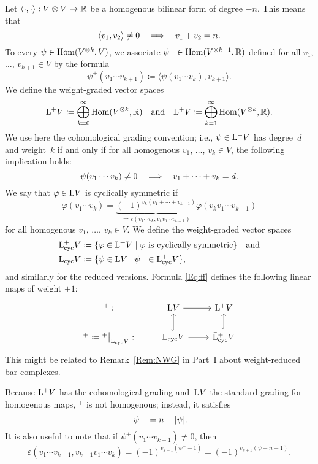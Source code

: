 \documentclass[\MainFolder/Text.tex]{subfiles}
\begin{document}
Let $\langle\cdot,\cdot\rangle: V \otimes V \rightarrow \mathbb{R}$ be a homogenous bilinear form of degree $-n$. This means that
\[ \langle v_1, v_2 \rangle \neq 0\quad\Longrightarrow\quad v_1 + v_2 = n. \]
To every $\psi\in \mathrm{Hom}(V^{\otimes k},V)$, we associate $\psi^+\in \mathrm{Hom}(V^{\otimes k + 1},\mathbb{R})$ defined for all $v_1$, $\dotsc$, $v_{k + 1} \in V$ by the formula
\begin{equation}\label{Eq:ff}
\psi^+(v_1\dotsb v_{k+1}) \coloneqq \langle \psi(v_1 \dotsb v_{k}),v_{k+1}\rangle.
\end{equation}
We define the weight-graded vector spaces
\begin{equation}\label{Eq:DSpPlusDef}
\mathrm{L}^+ V \coloneqq \bigoplus_{k=0}^\infty \mathrm{Hom}(V^{\otimes k},\mathbb{R})\quad\text{and}\quad\bar{\mathrm{L}}^+ V \coloneqq \bigoplus_{k=1}^\infty \mathrm{Hom}(V^{\otimes k},\mathbb{R}).
\end{equation}
We use here the cohomological grading convention; i.e., $\psi\in \mathrm{L}^+ V$ has degree~$d$ and weight~$k$ if and only if for all homogenous $v_1$, $\dotsc$, $v_k\in V$, the following implication holds:
\[ \psi(v_1 \dotsb v_k) \neq 0 \quad\Longrightarrow \quad v_1 + \dotsb + v_k = d. \] 
We say that $\varphi\in \mathrm{L} V$ is cyclically symmetric if 
\[ \varphi(v_1 \dotsb v_{k}) = \underbrace{(-1)^{v_{k}(v_1 + \dotsb + v_{k-1})}}_{\eqqcolon\varepsilon(v_1\dotsb v_{k},v_{k} v_1 \dotsb v_{k-1})} \varphi(v_{k} v_1 \dotsb v_{k-1}) \]
for all homogenous $v_1$, $\dotsc$, $v_{k}\in V$. We define the weight-graded vector spaces
\begin{align*}
\mathrm{L}^+_{\mathrm{cyc}} V &\coloneqq \{\varphi\in \mathrm{L}^+ V \mid \varphi\text{ is cyclically symmetric}\}\quad\text{and} \\
\mathrm{L}_{\mathrm{cyc}} V &\coloneqq \{\psi \in \mathrm{L} V \mid \psi^+ \in \mathrm{L}^+_{\mathrm{cyc}} V \},
\end{align*}
and similarly for the reduced versions. Formula \eqref{Eq:ff} defines the following linear maps of weight $+1$:
\begin{equation}\label{Eq:CycDiag}
\begin{tikzcd}
 {}^+: & \DSp V \arrow{r} & \DSpPlusRed V \\
 {}^+\coloneqq \Restr{{}^+}{\DSpCyc V}: & \DSpCyc V \arrow{r}\arrow[hook]{u} & \DSpPlusCycRed V\arrow[hook]{u}
\end{tikzcd}
\end{equation}
This might be related to Remark~\ref{Rem:NWG} in Part~I about weight-reduced bar complexes.

Because $\mathrm{L}^+ V$ has the cohomological grading and~$\mathrm{L} V$ the standard grading for homogenous maps, ${}^+$ is not homogenous; instead, it satisfies 
\[|\psi^+| = n - |\psi|. \]
It is also useful to note that if $\psi^+(v_1\dotsb v_{k+1})\neq 0$, then
\[ \varepsilon(v_1\dotsb v_{k+1},v_{k+1} v_1 \dotsb v_k) = (-1)^{v_{k+1}(\psi^+ - 1)} = (-1)^{v_{k+1}(\psi - n - 1)}. \]
\end{document}
